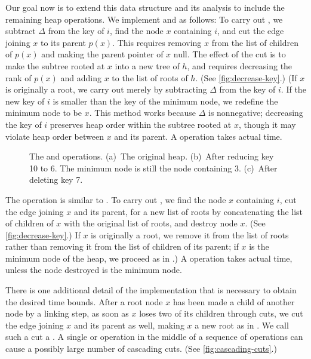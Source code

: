 Our goal now is to extend this data structure and its analysis to include the
remaining heap operations. We implement  and  as
follows: To carry out , we subtract \(\Delta\) from
the key of \(i\), find the node \(x\) containing \(i\), and cut the edge joining
\(x\) to its parent \(p(x)\). This requires removing \(x\) from the list of children
of \(p(x)\) and making the parent pointer of \(x\) null. The effect of the cut is to
make the subtree rooted at \(x\) into a new tree of \(h\), and requires decreasing
the rank of \(p(x)\) and adding \(x\) to the list of roots of \(h\). (See
\autoref{fig:decrease-key}.) (If \(x\) is originally a root, we carry out
 merely by subtracting \(\Delta\) from the key of
\(i\). If the new key of \(i\) is smaller than the key of the minimum node, we
redefine the minimum node to be \(x\). This method works because \(\Delta\) is
nonnegative; decreasing the key of \(i\) preserves heap order within the subtree
rooted at \(x\), though it may violate heap order between \(x\) and its parent.
A  operation takes  actual time.

\begin{figure}
    \caption{The  and  operations. (a)~The original
    heap. (b)~After reducing key 10 to 6. The minimum node is still the node
    containing 3. (c)~After deleting key 7.}
    \label{fig:decrease-key}
\end{figure}

The  operation is similar to . To carry out
, we find the node \(x\) containing \(i\), cut the edge joining
\(x\) and its parent, for a new list of roots by concatenating the list of children
of \(x\) with the original list of roots, and destroy node \(x\). (See
\autoref{fig:decrease-key}.) If \(x\) is originally a root, we remove it from the
list of roots rather than removing it from the list of children of its parent; if
\(x\) is the minimum node of the heap, we proceed as in .)
A  operation takes  actual time, unless the node destroyed is
the minimum node.

There is one additional detail of the implementation that is necessary to obtain the
desired time bounds. After a root node \(x\) has been made a child of another node by
a linking step, as soon as \(x\) loses two of its children through cuts, we cut the
edge joining \(x\) and its parent as well, making \(x\) a new root as in
. We call such a cut a . A single
 or  operation in the middle of a sequence of
operations can cause a possibly large number of cascading cuts. (See
\autoref{fig:cascading-cuts}.)

